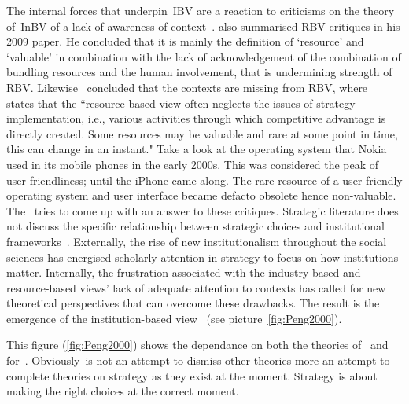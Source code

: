 The internal forces that underpin~\gls{IBV} are a reaction to criticisms on the theory of~\gls{InBV} of a lack of awareness of context~\cite{Narayanan:2005}. 
\cite{Kraaijenbrink:2009} also summarised \gls{RBV} critiques in his 2009 paper. 
He concluded that it is mainly the definition of `resource' and `valuable' in combination with the lack of acknowledgement of the combination of bundling resources and the human involvement, that is undermining strength of \gls{RBV}.
Likewise~\cite{Priem:2001} concluded that the contexts are missing from \gls{RBV}, where~\cite{Dung:2012} states that the ``resource-based view often neglects the issues of strategy implementation, i.e., various activities through which competitive advantage is directly created. Some resources may be valuable and rare at some point in time, this can change in an instant." 
Take a look at the operating system that Nokia used in its mobile phones in the early 2000s. 
This was considered the peak of user-friendliness; until the iPhone came along. 
The rare resource of a user-friendly operating system and user interface became defacto obsolete hence non-valuable.\\

The \ibv~tries to come up with an answer to these critiques. 
Strategic literature does not discuss the specific relationship between strategic choices and institutional frameworks~\cite{Peng:2008}.
Externally, the rise of new institutionalism throughout the social sciences has energised scholarly attention in strategy to focus on how institutions matter. 
Internally, the frustration associated with the industry-based and resource-based views’ lack of adequate attention to contexts has called for new theoretical perspectives that can overcome these drawbacks. 
The result is the emergence of the institution-based view~\cite{Peng:2009} (see picture~\ref{fig:Peng2000}).




This figure (\ref{fig:Peng2000}) shows the dependance on both the theories of~\cite{Barney:2001} and~\cite{Porter:1980} for~\ibv. Obviously~\ibv is not an attempt to dismiss other theories more an attempt to complete theories on strategy as they exist at the moment. Strategy is about making the right choices at the correct moment. \\

